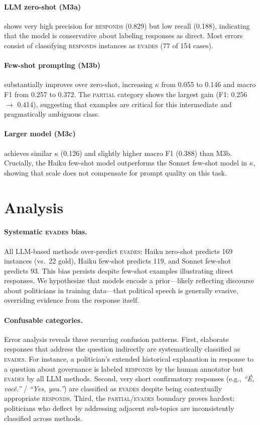 \documentclass[11pt]{article}
\begin{document}
\paragraph{LLM zero-shot (M3a)} shows very high precision for \textsc{responds} (0.829) but low recall (0.188), indicating that the model is conservative about labeling responses as direct. Most errors consist of classifying \textsc{responds} instances as \textsc{evades} (77 of 154 cases).

\paragraph{Few-shot prompting (M3b)} substantially improves over zero-shot, increasing $\kappa$ from 0.055 to 0.146 and macro F1 from 0.257 to 0.372. The \textsc{partial} category shows the largest gain (F1: 0.256 $\to$ 0.414), suggesting that examples are critical for this intermediate and pragmatically ambiguous class.

\paragraph{Larger model (M3c)} achieves similar $\kappa$ (0.126) and slightly higher macro F1 (0.388) than M3b. Crucially, the Haiku few-shot model outperforms the Sonnet few-shot model in $\kappa$, showing that scale does not compensate for prompt quality on this task.

\section{Analysis}

\paragraph{Systematic \textsc{evades} bias.}
All LLM-based methods over-predict \textsc{evades}: Haiku zero-shot predicts 169 instances (vs.\ 22 gold), Haiku few-shot predicts 119, and Sonnet few-shot predicts 93. This bias persists despite few-shot examples illustrating direct responses. We hypothesize that models encode a prior---likely reflecting discourse about politicians in training data---that political speech is generally evasive, overriding evidence from the response itself.

\paragraph{Confusable categories.}
Error analysis reveals three recurring confusion patterns. First, elaborate responses that address the question indirectly are systematically classified as \textsc{evades}. For instance, a politician's extended historical explanation in response to a question about governance is labeled \textsc{responds} by the human annotator but \textsc{evades} by all LLM methods. Second, very short confirmatory responses (e.g., \textit{``É, você.''} / \textit{``Yes, you.''}) are classified as \textsc{evades} despite being contextually appropriate \textsc{responds}. Third, the \textsc{partial}/\textsc{evades} boundary proves hardest: politicians who deflect by addressing adjacent sub-topics are inconsistently classified across methods.
\end{document}
